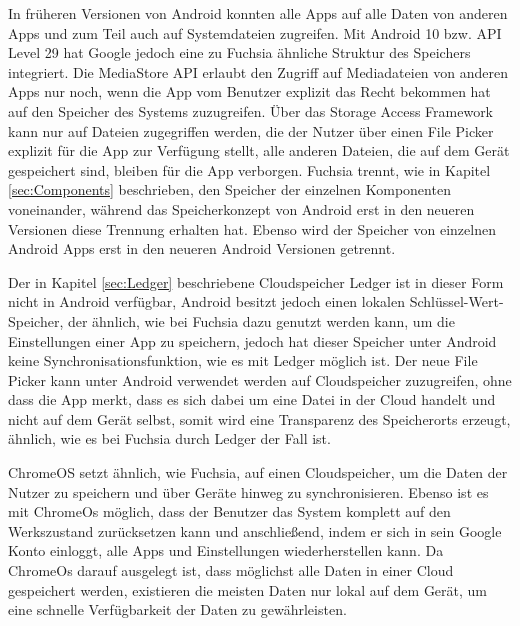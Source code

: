 \documentclass[a4paper]{scrartcl}
\begin{document}
In früheren Versionen von Android konnten alle Apps auf alle Daten von anderen Apps und zum Teil auch auf Systemdateien zugreifen. Mit Android 10 bzw. API Level 29 hat Google jedoch eine zu Fuchsia ähnliche Struktur des Speichers integriert. Die MediaStore API erlaubt den Zugriff auf Mediadateien von anderen Apps nur noch, wenn die App vom Benutzer explizit das Recht bekommen hat auf den Speicher des Systems zuzugreifen. Über das Storage Access Framework kann nur auf Dateien zugegriffen werden, die der Nutzer über einen File Picker explizit für die App zur Verfügung stellt, alle anderen Dateien, die auf dem Gerät gespeichert sind, bleiben für die App verborgen. Fuchsia trennt, wie in Kapitel \ref{sec:Components} beschrieben, den Speicher der einzelnen Komponenten voneinander, während das Speicherkonzept von Android erst in den neueren Versionen diese Trennung erhalten hat. Ebenso wird der Speicher von einzelnen Android Apps erst in den neueren Android Versionen getrennt. \cite{Android.Storage.Overview}

Der in Kapitel \ref{sec:Ledger} beschriebene Cloudspeicher Ledger ist in dieser Form nicht in Android verfügbar, Android besitzt jedoch einen lokalen Schlüssel-Wert-Speicher, der ähnlich, wie bei Fuchsia dazu genutzt werden kann, um die Einstellungen einer App zu speichern, jedoch hat dieser Speicher unter Android keine Synchronisationsfunktion, wie es mit Ledger möglich ist. \cite{Android.Storage.Overview} Der neue File Picker kann unter Android verwendet werden auf Cloudspeicher zuzugreifen, ohne dass die App merkt, dass es sich dabei um eine Datei in der Cloud handelt und nicht auf dem Gerät selbst, somit wird eine Transparenz des Speicherorts erzeugt, ähnlich, wie es bei Fuchsia durch Ledger der Fall ist. \cite{Android.Storage.DocumentProvider}

ChromeOS setzt ähnlich, wie Fuchsia, auf einen Cloudspeicher, um die Daten der Nutzer zu speichern und über Geräte hinweg zu synchronisieren. Ebenso ist es mit ChromeOs möglich, dass der Benutzer das System komplett auf den Werkszustand zurücksetzen kann und anschließend, indem er sich in sein Google Konto einloggt, alle Apps und Einstellungen wiederherstellen kann. Da ChromeOs darauf ausgelegt ist, dass möglichst alle Daten in einer Cloud gespeichert werden, existieren die meisten Daten nur lokal auf dem Gerät, um eine schnelle Verfügbarkeit der Daten zu gewährleisten.
\end{document}
